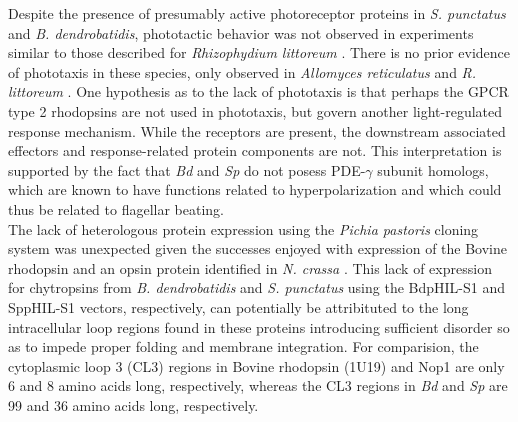 \indent Despite the presence of presumably active photoreceptor proteins in \textit{S. punctatus} and \textit{B. dendrobatidis}, phototactic behavior was not observed in experiments similar to those described for \textit{Rhizophydium littoreum} \cite{Muehlstein1987}. There is no prior evidence of phototaxis in these species, only observed in \textit{Allomyces reticulatus} \cite{Saranak1997} and \textit{R. littoreum} \cite{Muehlstein1987}. One hypothesis as to the lack of phototaxis is that perhaps the GPCR type 2 rhodopsins are not used in phototaxis, but govern another light-regulated response mechanism. While the receptors are present, the downstream associated effectors and response-related protein components are not. This interpretation is supported by the fact that \textit{Bd} and \textit{Sp} do not posess PDE-$\gamma$ subunit homologs, which are known to have functions related to hyperpolarization and which could thus be related to flagellar beating.\\
\indent The lack of heterologous protein expression using the \textit{Pichia pastoris} cloning system was unexpected given the successes enjoyed with expression of the Bovine rhodopsin \cite{Abdulaev1997} and an opsin protein identified in \textit{N. crassa} \cite{Bieszke1999}. This lack of expression for chytropsins from \textit{B. dendrobatidis} and \textit{S. punctatus} using the BdpHIL-S1 and SppHIL-S1 vectors, respectively, can potentially be attribituted to the long intracellular loop regions found in these proteins introducing sufficient disorder so as to impede proper folding and membrane integration. For comparision, the cytoplasmic loop 3 (CL3) regions in Bovine rhodopsin (1U19) and Nop1 are only 6 and 8 amino acids long, respectively, whereas the CL3 regions in \textit{Bd} and \textit{Sp} are 99 and 36 amino acids long, respectively.\\
